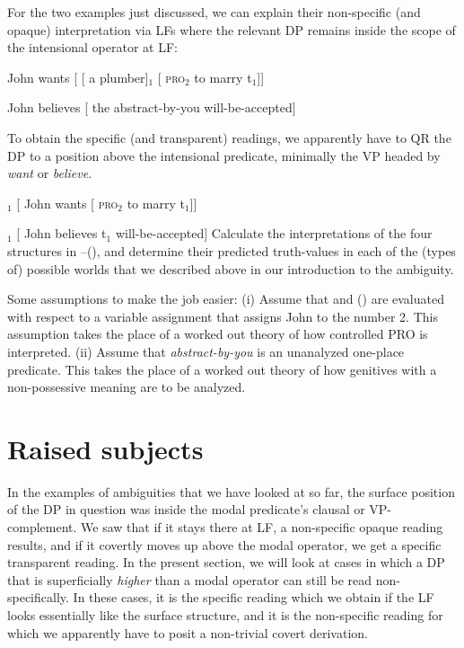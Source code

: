 \begin{exercise}

For the two examples just discussed, we can explain their non-specific (and
opaque) interpretation via LFs where the relevant DP remains inside the scope of
the intensional operator at LF:

\ex\label{first} John wants [ [ a plumber]$_1$ [ \textsc{pro}$_2$ to marry
t$_1$]] \xe

\ex John believes [ the abstract-by-you will-be-accepted] \xe

To obtain the specific (and transparent) readings, we apparently have to QR the
DP to a position above the intensional predicate, minimally the VP headed by
\emph{want} or \emph{believe}.

\ex\null [ a plumber]$_1$ [ John wants [ \textsc{pro}$_2$ to marry t$_1$]] \xe

\ex{}$_1$ [ John believes t$_1$ will-be-accepted] \xe
%	
Calculate the interpretations of the four structures in --(\lastx),
and determine their predicted truth-values in each of the (types of) possible
worlds that we described above in our introduction to the ambiguity.
	
Some assumptions to make the job easier: (i) Assume that  and (\blastx)
are evaluated with respect to a variable assignment that assigns John to the
number 2. This assumption takes the place of a worked out theory of how
controlled PRO is interpreted. (ii) Assume that \emph{abstract-by-you} is an
unanalyzed one-place predicate. This takes the place of a worked out theory of
how genitives with a non-possessive meaning are to be analyzed. \eex
\end{exercise}

\section{Raised subjects}
\label{sec:raised}

In the examples of ambiguities that we have looked at so far, the surface
position of the DP in question was inside the modal predicate's clausal or
VP-complement. We saw that if it stays there at LF, a non-specific opaque
reading results, and if it covertly moves up above the modal operator, we get a
specific transparent reading. In the present section, we will look at cases in
which a DP that is superficially \emph{higher} than a modal operator can still
be read non-specifically. In these cases, it is the specific reading which we
obtain if the LF looks essentially like the surface structure, and it is the
non-specific reading for which we apparently have to posit a non-trivial covert
derivation.

